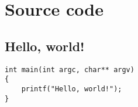 \section{Source code}

\subsection{Hello, world!}

\lstset{language=C++}
\begin{lstlisting}
int main(int argc, char** argv)
{
	printf("Hello, world!");
}
\end{lstlisting}
